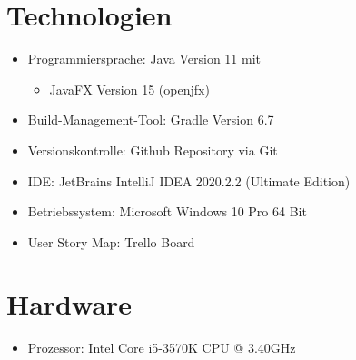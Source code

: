 \section{Technologien}

\begin{itemize}
    \item Programmiersprache: Java Version 11 mit
    \begin{itemize}
        \item JavaFX Version 15 (openjfx)
    \end{itemize}
    \item Build-Management-Tool: Gradle\cite{gradle} Version 6.7
    \item Versionskontrolle: Github Repository\cite{github} via Git\cite{git}
    \item IDE: JetBrains IntelliJ IDEA\cite{idea} 2020.2.2 (Ultimate Edition)
    \item Betriebssystem: Microsoft Windows 10 Pro 64 Bit
    \item User Story Map: Trello Board\cite{trello}
\end{itemize}

\section{Hardware}

\begin{itemize}
    \item Prozessor: Intel Core i5-3570K CPU @ 3.40GHz
\end{itemize}